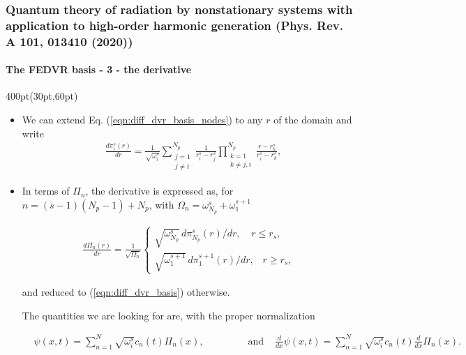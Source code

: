 \begin{frame}
\frametitle{Quantum theory of radiation by nonstationary systems 
	with application to high-order harmonic generation
        (Phys. Rev. A 101, 013410 (2020))}
	\framesubtitle{The FEDVR basis - 3 - the derivative}


\begin{textblock*}{400pt}(30pt,60pt)
\footnotesize
\begin{itemize}
\item We can extend Eq. (\ref{eqn:diff_dvr_basis_nodes}) to any $r$
of the domain and write
\begin{align}
& \frac{d\pi_i^s (r)}{dr}
       =  \frac{1}{\sqrt{\omega_i^s}} \sum_{\substack{j=1 \\ j\neq i}}^{N_p} 
       \frac{1}{r_i^s - r_j^s}\prod_{\substack{k=1 \\ k\neq j,i}}^{N_p}
       \frac{r - r_k^s}{r_i^s - r_k^s},
\label{eqn:diff_dvr_basis}
\end{align}

\item In terms of $\Pi_n$, the derivative is expressed as,
for $n = (s-1)(N_p-1) + N_p$, 
with $\Omega_n = \omega_{N_p}^s + \omega_1^{s+1}$

\begin{align}
& \frac{d\Pi_n(r)}{dr}
=  \frac{1}{\sqrt{\Omega_n}}
      \left\lbrace
         \begin{array}{l} 
       \sqrt{\omega_{N_p}^s}\,d\pi_{N_p}^s(r)/dr,  
          \hspace{10pt} \ r \leqslant r_s, \hspace{10pt} \\
       \sqrt{\omega_{1}^{s+1}}\,d\pi_{1}^{s+1}(r)/dr,  
          \hspace{10pt} r \geqslant  r_{s}, \hspace{10pt}
         \end{array}\right.
\end{align}

\noindent and reduced to (\ref{eqn:diff_dvr_basis}) otherwise.

The quantities we are looking for are, with the proper normalization

\begin{align}
&\psi(x,t) = \sum_{n=1}^{N} \sqrt{\omega^s_i}
          c_n(t)\Pi_n(x), \hspace{50pt} \mbox{ and }
&\frac{d}{dx}\psi(x,t) = \sum_{n=1}^{N} \sqrt{\omega^s_i}
         c_n(t) \frac{d}{dx}\Pi_n(x).
\label{eqn:wf_dwf}
\end{align}

\end{itemize}
\end{textblock*}

\end{frame}






